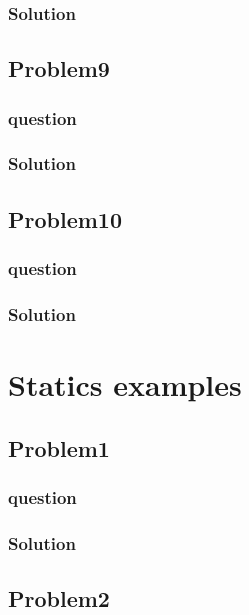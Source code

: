 \documentclass[journal,12pt,twocolumn]{IEEEtran}
\begin{document}
\subsubsection{Solution}


\subsection{Problem9}
\subsubsection{question}

\subsubsection{Solution}


\subsection{Problem10}
\subsubsection{question}

\subsubsection{Solution}



\section{Statics examples}
\subsection{Problem1}
\subsubsection{question}

\subsubsection{Solution}


\subsection{Problem2}
\end{document}
